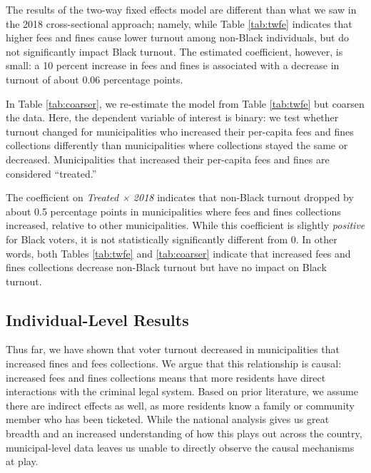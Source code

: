 \documentclass[
  12pt,
]{article}
\begin{document}
The results of the two-way fixed effects model are different than what we saw in the 2018 cross-sectional approach; namely, while Table \ref{tab:twfe} indicates that higher fees and fines cause lower turnout among non-Black individuals, but do not significantly impact Black turnout. The estimated coefficient, however, is small: a 10 percent increase in fees and fines is associated with a decrease in turnout of about 0.06 percentage points.

In Table \ref{tab:coarser}, we re-estimate the model from Table \ref{tab:twfe} but coarsen the data. Here, the dependent variable of interest is binary: we test whether turnout changed for municipalities who increased their per-capita fees and fines collections differently than municipalities where collections stayed the same or decreased. Municipalities that increased their per-capita fees and fines are considered ``treated.''

\begin{singlespace}

\end{singlespace}

The coefficient on \emph{Treated × 2018} indicates that non-Black turnout dropped by about 0.5 percentage points in municipalities where fees and fines collections increased, relative to other municipalities. While this coefficient is slightly \emph{positive} for Black voters, it is not statistically significantly different from 0. In other words, both Tables \ref{tab:twfe} and \ref{tab:coarser} indicate that increased fees and fines collections decrease non-Black turnout but have no impact on Black turnout.

\hypertarget{individual-level-results}{%
\subsection*{Individual-Level Results}\label{individual-level-results}}

Thus far, we have shown that voter turnout decreased in municipalities that increased fines and fees collections. We argue that this relationship is causal: increased fees and fines collections means that more residents have direct interactions with the criminal legal system. Based on prior literature, we assume there are indirect effects as well, as more residents know a family or community member who has been ticketed. While the national analysis gives us great breadth and an increased understanding of how this plays out across the country, municipal-level data leaves us unable to directly observe the causal mechanisms at play.
\end{document}
